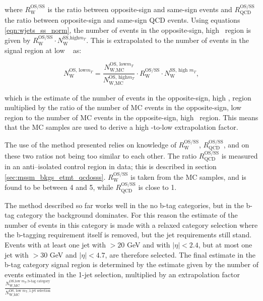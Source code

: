where $R_{\text{W}}^{\text{OS/SS}}$ is the ratio between opposite-sign and same-sign \Wjets events
and $R_{\text{QCD}}^{\text{OS/SS}}$ the ratio between opposite-sign and same-sign QCD events. Using 
equations \ref{eqn:wjets_ss_norm}, the number of \Wjets events in the
opposite-sign, high \mT~region is given by $R_{\text{W}}^{\text{OS/SS}}\cdot N_{\text{W}}^{\text{SS,high} m_{T}}$. 
This is extrapolated to the number of \Wjets events in the signal region at low \mT~ as:

\begin{equation}\label{eqn:wjets_os_norm}
N_{\text{W}}^{\text{OS, low} m_{T}} = \frac{N_{\text{W,MC}}^{\text{OS, low} m_{T}}}{N_{\text{W,MC}}^{\text{OS, high} m_{T}}}\cdot R_{\text{W}}^{\text{OS/SS}} \cdot N_{\text{W}}^{\text{SS, high }m_{T}},
\end{equation}

which is the estimate of the number of \Wjets events in the opposite-sign, high \mT, region
multiplied by the ratio of the number of \ac{MC} events in the opposite-sign, low \mT~ region to the number of \ac{MC} events in the opposite-sign, high \mT~region. This means that
the \ac{MC} samples are used to derive a high \mT-to-low \mT extrapolation factor.

The use of the method presented relies on knowledge of $R_{\text{W}}^{\text{OS/SS}}$,
$R_{\text{QCD}}^{\text{OS/SS}}$, and on these two ratios not being too similar to each other. 
The ratio $R_{\text{QCD}}^{\text{OS/SS}}$ is measured in an anti--isolated
control region in data; this is described in section \ref{sec:mssm_bkgs_etmt_qcdosss}. $R_{\text{W}}^{\text{OS/SS}}$ is 
taken from the \Wjets \ac{MC} samples, and is found to be between 4 and 5, while $R_{\text{QCD}}^{\text{OS/SS}}$
is close to 1.

The method described so far works well in the no b-tag categories, but in the b-tag category
the \ttbar background dominates. For this reason the estimate of the number
of \Wjets events in this category is made with a relaxed category selection where the b-tagging
requirement itself is removed, but the jet requirements still stand. Events with at least one 
jet with \pT$>20$ GeV and with $|\eta|<2.4$, but at most one jet with \pT$>30$ GeV and $|\eta|<4.7$, are therefore selected. The final \Wjets estimate in the b-tag category signal
region is determined by the estimate given by the number of \Wjets events
estimated in the 1-jet selection, multiplied by an extrapolation factor 
$\frac{N_{\text{W,MC}}^{\text{OS,low } m_{T},\text{b-tag category}}}{N_{\text{W,MC}}^{\text{OS, low }m_{\text{T}},\text{1-jet selection}}}$

